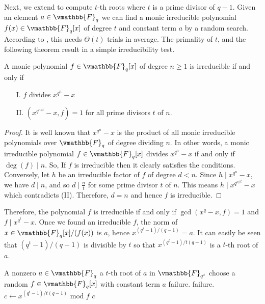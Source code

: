 Next, we extend  to compute $t$-th roots where $t$ is a prime 
divisor of $q - 1$. Given an element $a \in \vmathbb{F}_q$ we can find a monic irreducible polynomial 
$f(x) \in \vmathbb{F}_q[x]$ of degree $t$ and constant term $a$ by a random search. According to 
, this needs $\Theta(t)$ trials in average. The primality of $t$, 
and the following theorem result in a simple irreducibility test. 
\begin{lemma}
\label{lemma:irr}
A monic polynomial $f \in \vmathbb{F}_q[x]$ of degree $n \ge 1$ is irreducible if and only if 
\begin{itemize}
\item[I.] $f$ divides $x^{q^n} - x$
\item[II.] $(x^{q^{n/t}} - x, f) = 1$ for all prime divisors $t$ of $n$. 
\end{itemize}
\end{lemma}
\begin{proof}
It is well known that $x^{q^n} - x$ is the product of all monic irreducible polynomials over 
$\vmathbb{F}_q$ of degree dividing $n$. In other words, a monic irreducible polynomial $f \in 
\vmathbb{F}_q[x]$ divides $x^{q^n} - x$ if and only if $\deg(f) \mid n$. So, If $f$ is irreducible 
then it clearly satisfies the conditions. Conversely, let $h$ be an irreducible factor of $f$ of 
degree $d < n$. Since $h \mid x^{q^n} - x$, we have $d \mid n$, and so $d \mid \frac{n}{t}$ for some 
prime divisor $t$ of $n$. This means $h \mid x^{q^{n/t}} - x$ which contradicts (II). Therefore, $d 
= n$ and hence $f$ is irreducible.
\end{proof}
Therefore, the polynomial $f$ is irreducible if and only if $\gcd(x^q - x, f) = 1$ and $f \mid 
x^{q^t} - x$. Once we found an irreducible $f$, the norm of $x \in \vmathbb{F}_q[x] / (f(x))$ is $a$, 
hence $x^{(q^t - 1) / (q - 1)} = a$. It can easily be seen that $(q^t - 1) / (q - 1)$ is divisible 
by $t$ so that $x^{(q^t - 1) / t(q - 1)}$ is a $t$-th root of $a$. 

\begin{algorithm}
\label{algorithm:Cipolla-t}
\begin{algorithmic}[1]
\REQUIRE A nonzero $a \in \vmathbb{F}_q$
\ENSURE a $t$-th root of $a$ in $\vmathbb{F}_{q^t}$
\STATE choose a random $f \in \vmathbb{F}_q[x]$ with constant term $a$
\label{step:Cipolla-t-gcd} 
	\RETURN failure.
\ENDIF
{} 
\label{step:Cipolla-t-div} 
	\RETURN failure.
\ENDIF 
\STATE $c \leftarrow x^{(q^t - 1) / t(q - 1)} \text{ mod } f$
\label{step:Cipolla-t-mod}
\RETURN $c$
\end{algorithmic}
\end{algorithm}


